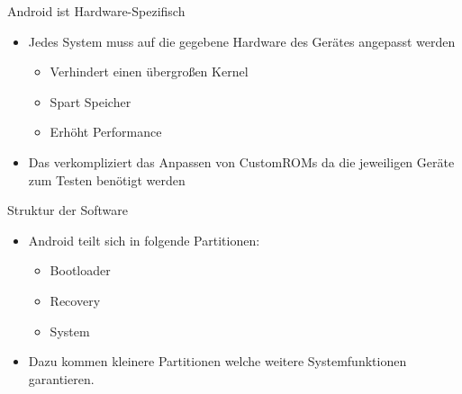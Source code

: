 \begin{frame}{Android ist Hardware-Spezifisch}
	\begin{itemize}
		\item Jedes System muss auf die gegebene Hardware des Gerätes angepasst werden
		\begin{itemize}
			\item Verhindert einen übergroßen Kernel
			\item Spart Speicher
			\item Erhöht Performance
		\end{itemize}
		\item Das verkompliziert das Anpassen von CustomROMs da die jeweiligen Geräte zum Testen benötigt werden
	\end{itemize}
\end{frame}

\begin{frame}{Struktur der Software}
	\begin{itemize}[<+->]
		\item Android teilt sich in folgende Partitionen:
		\begin{itemize}[<+->]
			\item Bootloader 
			\item Recovery
			\item System
		\end{itemize}
		\item Dazu kommen kleinere Partitionen welche weitere Systemfunktionen garantieren.
	\end{itemize}
\end{frame}